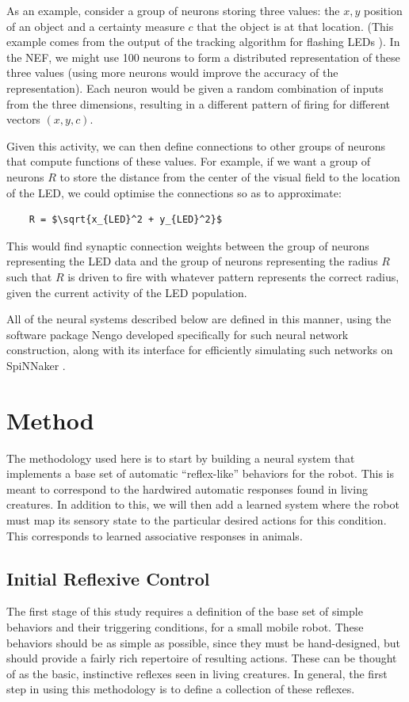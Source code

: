\documentclass{frontiersSCNS}
\begin{document}
As an example, consider a group of neurons storing three values: the $x,y$ 
position of an object and a certainty measure $c$ that the object is at that
location.  (This example comes from the output of the tracking algorithm 
for flashing LEDs \citep{muller2011miniature}).  In the NEF, we might use 100 
neurons to form a distributed representation of these three values 
(using more neurons would improve the accuracy of the representation).  Each
neuron would be given a random combination of inputs from the three dimensions,
resulting in a different pattern of firing for different vectors $(x,y,c)$.

Given this activity, we can then define connections to other groups of neurons
that compute functions of these values. For example, if we want a group of 
neurons $R$ to store the distance from the center of the visual field to the 
location of the LED, we could optimise the connections so
as to approximate: 
 
\begin{lstlisting}
    R = $\sqrt{x_{LED}^2 + y_{LED}^2}$
\end{lstlisting}

This would find synaptic connection weights between the group of neurons 
representing the LED data and the group of neurons representing the 
radius $R$ such that $R$ is driven to fire with whatever pattern represents 
the correct radius, given the current activity of the LED population. 

All of the neural systems described below are defined in this manner, using
the software package Nengo \citep{bekolay_nengo2014} developed specifically
for such neural network construction, along with its interface
for efficiently simulating such networks on SpiNNaker \citep{mundy2015}.

\section{Method}

The methodology used here is to start by building a neural system that
implements a base set of automatic ``reflex-like'' behaviors for the robot.
This is meant to correspond to the hardwired automatic responses found in
living creatures.  In addition to this, we will then add a learned system
where the robot must map its sensory state to the particular desired actions
for this condition.  This corresponds to learned associative responses
in animals.

\subsection{Initial Reflexive Control}
The first stage of this study requires a definition of the base set of simple 
behaviors and their triggering conditions, for a small mobile robot. These 
behaviors should be as simple as possible, since they must be hand-designed, 
but should provide a fairly rich repertoire of resulting actions. These can be 
thought of as the basic, instinctive reflexes seen in living creatures. In
general, the first step in using this methodology is to define a collection
of these reflexes.
\end{document}
